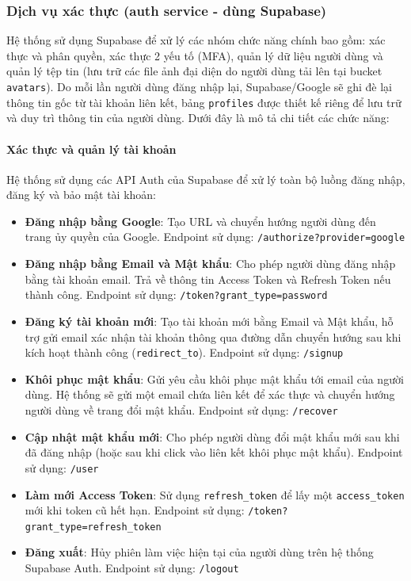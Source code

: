 \subsubsection{Dịch vụ xác thực (auth service - dùng Supabase)}

Hệ thống sử dụng Supabase
để xử lý các nhóm chức năng chính bao gồm:
xác thực và phân quyền,
xác thực 2 yếu tố (MFA),
quản lý dữ liệu người dùng
và quản lý tệp tin
(lưu trữ các file ảnh đại diện do người dùng tải lên tại bucket \texttt{avatars}).
Do mỗi lần người dùng đăng nhập lại,
Supabase/Google sẽ ghi đè lại thông tin gốc từ tài khoản liên kết,
bảng \texttt{profiles} được thiết kế riêng để lưu trữ
và duy trì thông tin của người dùng.
Dưới đây là mô tả chi tiết các chức năng:

\paragraph{Xác thực và quản lý tài khoản}

Hệ thống sử dụng các API Auth của Supabase
để xử lý toàn bộ luồng đăng nhập, đăng ký
và bảo mật tài khoản:

\begin{itemize}

\item \textbf{Đăng nhập bằng Google}:
Tạo URL và chuyển hướng người dùng đến trang ủy quyền của Google.
Endpoint sử dụng: \texttt{/authorize?provider=google}

\item \textbf{Đăng nhập bằng Email và Mật khẩu}:
Cho phép người dùng đăng nhập bằng tài khoản email. Trả về thông tin Access Token và Refresh Token nếu thành công.
Endpoint sử dụng: \texttt{/token?grant\_type=password}

\item \textbf{Đăng ký tài khoản mới}:
Tạo tài khoản mới bằng Email và Mật khẩu, hỗ trợ gửi email xác nhận tài khoản thông qua đường dẫn chuyển hướng sau khi kích hoạt thành công (\texttt{redirect\_to}).
Endpoint sử dụng: \texttt{/signup}

\item \textbf{Khôi phục mật khẩu}:
Gửi yêu cầu khôi phục mật khẩu tới email của người dùng. Hệ thống sẽ gửi một email chứa liên kết để xác thực và chuyển hướng người dùng về trang đổi mật khẩu.
Endpoint sử dụng: \texttt{/recover}

\item \textbf{Cập nhật mật khẩu mới}:
Cho phép người dùng đổi mật khẩu mới sau khi đã đăng nhập (hoặc sau khi click vào liên kết khôi phục mật khẩu).
Endpoint sử dụng: \texttt{/user}

\item \textbf{Làm mới Access Token}:
Sử dụng \texttt{refresh\_token} để lấy
một \texttt{access\_token} mới
khi token cũ hết hạn.
Endpoint sử dụng: \texttt{/token?grant\_type=refresh\_token}

\item \textbf{Đăng xuất}:
Hủy phiên làm việc hiện tại của người dùng trên hệ thống Supabase Auth.
Endpoint sử dụng: \texttt{/logout}

\end{itemize}

